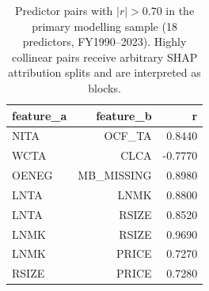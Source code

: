 \begin{table}[htbp]
\centering
\caption{Predictor pairs with $|r|>0.70$ in the primary modelling sample (18 predictors, FY1990--2023). Highly collinear pairs receive arbitrary SHAP attribution splits and are interpreted as blocks.}
\label{tab:high_corr}
\small
\begin{tabular}{lrr}
\toprule
feature\_a & feature\_b & r \\
\midrule
NITA & OCF\_TA & 0.8440 \\
WCTA & CLCA & -0.7770 \\
OENEG & MB\_MISSING & 0.8980 \\
LNTA & LNMK & 0.8800 \\
LNTA & RSIZE & 0.8520 \\
LNMK & RSIZE & 0.9690 \\
LNMK & PRICE & 0.7270 \\
RSIZE & PRICE & 0.7280 \\
\bottomrule
\end{tabular}
\end{table}
